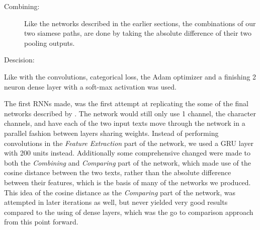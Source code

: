 \begin{description}
\item[Combining:] Like the networks described in the earlier sections,
the combinations of our two siamese paths, are done by taking the absolute difference
of their two pooling outputs.

\item[Descision:]



\end{description}








 Like with the
convolutions, categorical loss, the Adam optimizer and a finishing 2 neuron
dense layer with a soft-max activation was used.

The first \gls{RNN}s made, was the first attempt at replicating the some of
the final networks described by \cite{qian:2018}. The network would still only
use 1 channel, the character channels, and have each of the two input texts
move through the network in a parallel fashion between layers sharing weights.
Instead of performing convolutions in the \textit{Feature Extraction} part of
the network, we used a \gls{GRU} layer with 200 units instead. Additionally
some comprehensive changed were made to both the \textit{Combining} and
\textit{Comparing} part of the network, which made use of the cosine distance
between the two texts, rather than the absolute difference between their
features, which is the basis of many of the networks we produced. This idea of
the cosine distance as the \textit{Comparing} part of the network, was attempted
in later iterations as well, but never yielded very good results compared to the
using of dense layers, which was the go to comparison approach from this point
forward.

